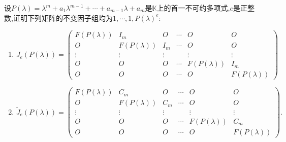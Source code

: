 \documentclass[../../main.tex]{subfiles}
\begin{document}
\begin{proposition}\label{proposition:广义标准型相关结论}
设$P(\lambda)=\lambda^m + a_1\lambda^{m - 1}+\cdots + a_{m - 1}\lambda + a_m$是$\mathbb{K}$上的首一不可约多项式,$e$是正整数,证明下列矩阵的不变因子组均为$1,\cdots,1,P(\lambda)^e$:
\begin{enumerate}[(1)]
\item $J_e(P(\lambda)) = 
\begin{pmatrix}
F(P(\lambda)) & I_m & O & \cdots & O & O \\
O & F(P(\lambda)) & I_m & \cdots & O & O \\
\vdots & \vdots & \vdots & & \vdots & \vdots \\
O & O & O & \cdots & F(P(\lambda)) & I_m \\
O & O & O & \cdots & O & F(P(\lambda))
\end{pmatrix}$

\item $\widetilde{J}_e(P(\lambda)) = 
\begin{pmatrix}
F(P(\lambda)) & C_m & O & \cdots & O & O \\
O & F(P(\lambda)) & C_m & \cdots & O & O \\
\vdots & \vdots & \vdots & & \vdots & \vdots \\
O & O & O & \cdots & F(P(\lambda)) & C_m \\
O & O & O & \cdots & O & F(P(\lambda))
\end{pmatrix}.$
\end{enumerate}
\end{proposition}
\end{document}
